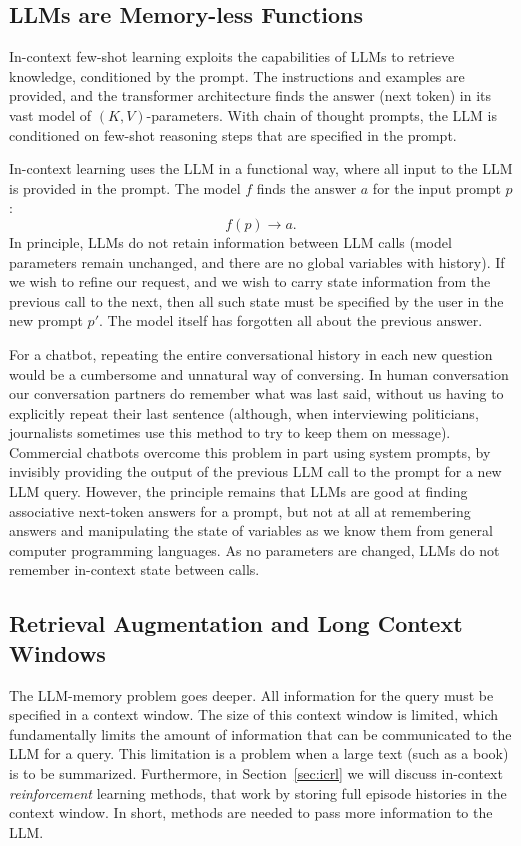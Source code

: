 \subsection{LLMs are Memory-less Functions}
In-context few-shot learning exploits the capabilities of LLMs to retrieve  knowledge, conditioned by the  prompt. The instructions and examples are provided, and the transformer architecture finds the answer (next token) in its vast model of $(K,V)$-parameters. With chain of thought prompts, the LLM is conditioned on few-shot  reasoning steps that are specified in the prompt. %

In-context learning uses the LLM in a functional way, where all input to the LLM is provided in the prompt. The model $f$ finds the answer $a$ for the input prompt $p$: $$f(p)\rightarrow a.$$
In principle, LLMs do not retain information between LLM calls (model parameters remain unchanged, and there are no global variables with  history). If we wish to refine our request, and we wish to carry state information from the previous call to the next, then all such state must be specified by the user in the new prompt $p'$. The model itself has forgotten all about the previous answer. 

For a chatbot, repeating the entire conversational history in each new question would be a cumbersome and unnatural way of conversing. In human conversation our conversation partners do remember what was last said, without us having to explicitly repeat their last sentence (although, when interviewing politicians, journalists sometimes use this method to try to keep them on message). 
Commercial chatbots  overcome this problem in part using system prompts, by invisibly providing the output of the previous LLM call to the prompt for a new LLM query. However, the principle remains that LLMs are good at finding associative next-token answers for a prompt, but not at all at remembering answers and manipulating the state of variables as we know them from general computer programming languages. As no parameters are changed, LLMs do not remember in-context state between calls.

\subsection{Retrieval Augmentation and Long Context Windows}
The LLM-memory problem goes deeper. All information for the query must be specified in a context window. The size of this context window is limited, which fundamentally limits the amount of information that can be communicated to the LLM for a query. This limitation is a problem %
when a large text (such as a book) is to be summarized. Furthermore, in Section~\ref{sec:icrl} we will discuss in-context {\em reinforcement} learning methods, that work by storing full episode histories in the context window. In short, methods are needed to pass more information to the LLM. 

